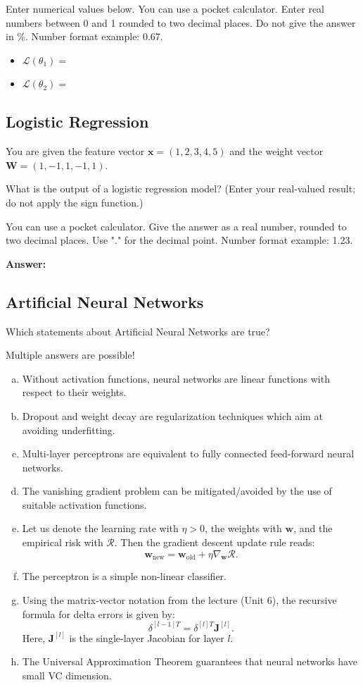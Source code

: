 \documentclass{article}
\begin{document}
Enter numerical values below. You can use a pocket calculator. Enter real numbers between 0 and 1 rounded to two decimal places. Do not give the answer in \%. Number format example: 0.67.

\begin{itemize}
    \item \(\mathcal{L}(\theta_1) =\)
    \item \(\mathcal{L}(\theta_2) =\)
\end{itemize}

\subsection*{Logistic Regression}

You are given the feature vector \(\mathbf{x} = (1, 2, 3, 4, 5)\) and the weight vector \(\mathbf{W} = (1, -1, 1, -1, 1)\).

What is the output of a logistic regression model? (Enter your real-valued result; do not apply the sign function.)

You can use a pocket calculator. Give the answer as a real number, rounded to two decimal places. Use "." for the decimal point. Number format example: 1.23.

\textbf{Answer:}

\subsection*{Artificial Neural Networks}

Which statements about Artificial Neural Networks are true?

Multiple answers are possible!

\begin{enumerate}[(a)]
    \item Without activation functions, neural networks are linear functions with respect to their weights.
    \item Dropout and weight decay are regularization techniques which aim at avoiding underfitting.
    \item Multi-layer perceptrons are equivalent to fully connected feed-forward neural networks.
    \item The vanishing gradient problem can be mitigated/avoided by the use of suitable activation functions.
    \item Let us denote the learning rate with \(\eta > 0\), the weights with \(\mathbf{w}\), and the empirical risk with \(\mathcal{R}\). Then the gradient descent update rule reads:
    \[
    \mathbf{w}_{\text{new}} = \mathbf{w}_{\text{old}} + \eta \nabla_{\mathbf{w}} \mathcal{R}.
    \]
    \item The perceptron is a simple non-linear classifier.
    \item Using the matrix-vector notation from the lecture (Unit 6), the recursive formula for delta errors is given by:
    \[
    \delta^{[l-1]T} = \delta^{[l]T} \mathbf{J}^{[l]}.
    \]
    Here, \(\mathbf{J}^{[l]}\) is the single-layer Jacobian for layer \(l\).
    \item The Universal Approximation Theorem guarantees that neural networks have small VC dimension.
\end{enumerate}
\end{document}
